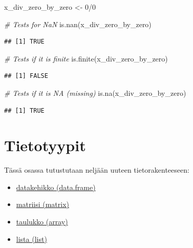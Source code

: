 \documentclass[
]{book}
\newenvironment{Shaded}{\begin{snugshade}}{\end{snugshade}}
\newcommand{\CommentTok}[1]{\textcolor[rgb]{0.56,0.35,0.01}{\textit{#1}}}
\newcommand{\DecValTok}[1]{\textcolor[rgb]{0.00,0.00,0.81}{#1}}
\newcommand{\FunctionTok}[1]{\textcolor[rgb]{0.00,0.00,0.00}{#1}}
\newcommand{\NormalTok}[1]{#1}
\newcommand{\OtherTok}[1]{\textcolor[rgb]{0.56,0.35,0.01}{#1}}
\newcommand{\SpecialCharTok}[1]{\textcolor[rgb]{0.00,0.00,0.00}{#1}}
\providecommand{\tightlist}{%
  \setlength{\itemsep}{0pt}\setlength{\parskip}{0pt}}
\begin{document}
\begin{Shaded}
\begin{Highlighting}[]
\NormalTok{x\_div\_zero\_by\_zero }\OtherTok{\textless{}{-}} \DecValTok{0}\SpecialCharTok{/}\DecValTok{0}

\CommentTok{\# Tests for NaN}
\FunctionTok{is.nan}\NormalTok{(x\_div\_zero\_by\_zero)}
\end{Highlighting}
\end{Shaded}

\begin{verbatim}
## [1] TRUE
\end{verbatim}

\begin{Shaded}
\begin{Highlighting}[]
\CommentTok{\# Tests if it is finite}
\FunctionTok{is.finite}\NormalTok{(x\_div\_zero\_by\_zero)}
\end{Highlighting}
\end{Shaded}

\begin{verbatim}
## [1] FALSE
\end{verbatim}

\begin{Shaded}
\begin{Highlighting}[]
\CommentTok{\# Tests if it is NA (missing)}
\FunctionTok{is.na}\NormalTok{(x\_div\_zero\_by\_zero)}
\end{Highlighting}
\end{Shaded}

\begin{verbatim}
## [1] TRUE
\end{verbatim}

\hypertarget{data_types}{%
\chapter{Tietotyypit}\label{data_types}}

Tässä osassa tutustutaan neljään uuteen tietorakenteeseen:

\begin{itemize}
\tightlist
\item
  \protect\hyperlink{data-frame}{datakehikko (data.frame)}
\item
  \protect\hyperlink{matrix}{matriisi (matrix)}
\item
  \protect\hyperlink{array}{taulukko (array)}
\item
  \protect\hyperlink{list}{lista (list)}
\end{itemize}
\end{document}

